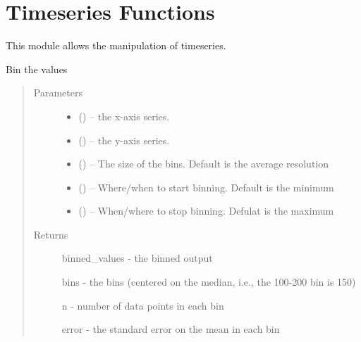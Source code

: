 \documentclass[letterpaper,10pt,english]{sphinxmanual}
\begin{document}
\chapter{Timeseries Functions}
\label{\detokenize{Timeseries::doc}}\label{\detokenize{Timeseries:timeseries-functions}}
This module allows the manipulation of timeseries.

\begin{fulllineitems}
\label{\detokenize{Timeseries:pyleoclim.Timeseries.bin}}
Bin the values
\begin{quote}\begin{description}
\item[{Parameters}] \leavevmode\begin{itemize}
\item {} 
 () -- the x-axis series.

\item {} 
 () -- the y-axis series.

\item {} 
 () -- The size of the bins. Default is the average resolution

\item {} 
 () -- Where/when to start binning. Default is the minimum

\item {} 
 () -- When/where to stop binning. Defulat is the maximum

\end{itemize}

\item[{Returns}] \leavevmode

binned\_values - the binned output

bins - the bins (centered on the median, i.e., the 100-200 bin is 150)

n - number of data points in each bin

error -  the standard error on the mean in each bin


\end{description}\end{quote}

\end{fulllineitems}
\end{document}
